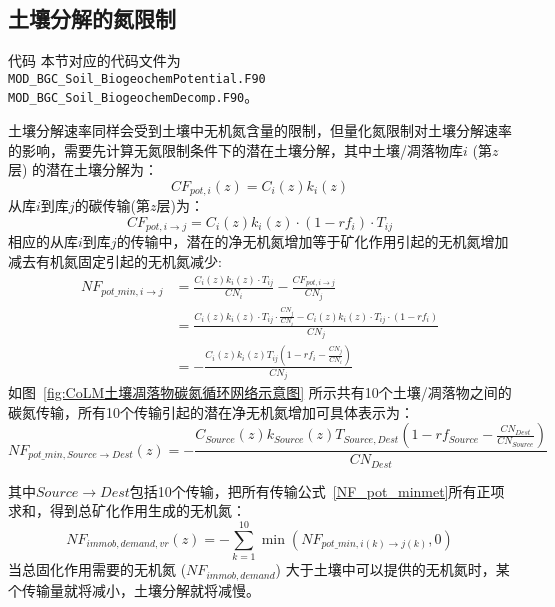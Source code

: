 \subsection{土壤分解的氮限制}\label{土壤分解的氮限制}
\begin{mymdframed}{代码}
本节对应的代码文件为\\ \texttt{MOD\_BGC\_Soil\_BiogeochemPotential.F90}\\
\texttt{MOD\_BGC\_Soil\_BiogeochemDecomp.F90}。
\end{mymdframed}
土壤分解速率同样会受到土壤中无机氮含量的限制，但量化氮限制对土壤分解速率的影响，需要先计算无氮限制条件下的潜在土壤分解，其中土壤/凋落物库$i$ (第$z$层) 的潜在土壤分解为：
\begin{equation}
C F_{pot, i}(z)=C_{i}(z) k_{i}(z)
\end{equation}
从库$i$到库$j$的碳传输(第$z$层)为：
\begin{equation}
C F_{pot, i \rightarrow j}=C_{i}(z) k_{i}(z) \cdot\left(1-r f_{i}\right) \cdot T_{i j}
\end{equation}
相应的从库$i$到库$j$的传输中，潜在的净无机氮增加等于矿化作用引起的无机氮增加减去有机氮固定引起的无机氮减少:
\begin{equation}
\begin{aligned}
NF_{pot\_{min, i \rightarrow j}}&=\frac{C_{i}(z) k_{i}(z) \cdot T_{ij}}{C N_{i}}-\frac{C F_{pot, i \rightarrow j}}{C N_{j}} \\
& =\frac{C_{i}(z) k_{i}(z) \cdot T_{i j} \cdot \frac{C N_{j}}{C N_{i}}-C_{i}(z) k_{i}(z) \cdot T_{i j} \cdot\left(1-r f_{i}\right)}{C N_{j}} \\
&=-\frac{C_{i}(z) k_{i}(z) T_{i j}\left(1-r f_{i}-\frac{C N_{j}}{C N_{i}}\right)}{C N_{j}}
\end{aligned}
\end{equation}
如图~\ref{fig:CoLM土壤凋落物碳氮循环网络示意图} 所示共有10个土壤/凋落物之间的碳氮传输，所有10个传输引起的潜在净无机氮增加可具体表示为：
\begin{equation}\label{NF_pot_minmet}
    NF_{{pot}\_{min,Source \rightarrow {Dest}}}(z)=-\frac{C_{{Source}}(z) k_{{Source}}(z) T_{Source, Dest}\left(1-r f_{Source}-\frac{C N_{{Dest }}}{C N_{Source}}\right)}{C N_{{Dest }}}
\end{equation}

其中$Source \rightarrow Dest$包括10个传输，把所有传输公式~\eqref{NF_pot_minmet}所有正项求和，得到总矿化作用生成的无机氮：
\begin{equation}\label{NF_immob_demand_vr}
    NF_{immob,demand,vr}(z)=-\sum_{k=1}^{10}\min{\left(NF_{pot\_min,i(k)\rightarrow j (k)}, 0\right)}
\end{equation}
当总固化作用需要的无机氮 ($NF_{immob,demand}$) 大于土壤中可以提供的无机氮时，某个传输量就将减小，土壤分解就将减慢。



